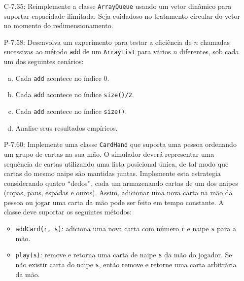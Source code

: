 \begin{enumerate}
\begin{itemize}
		\item[C-7.35:] Reimplemente a classe \texttt{ArrayQueue} usando um vetor dinâmico para suportar capacidade ilimitada. Seja cuidadoso no tratamento circular do vetor no momento do redimensionamento.
		
		\item[P-7.58:] Desenvolva um experimento para testar a eficiência de $n$ chamadas sucessivas ao método \texttt{add} de um \texttt{ArrayList} para vários $n$ diferentes, sob cada um dos seguintes cenários:
		\begin{enumerate}[a.]
			\item Cada \texttt{add} acontece no índice $0$.
			\item Cada \texttt{add} acontece no índice \texttt{size()/2}.
			\item Cada \texttt{add} acontece no índice \texttt{size()}.
			\item Analise seus resultados empíricos.
		\end{enumerate}
		
		\item[P-7.60:] Implemente uma classe \texttt{CardHand} que suporta uma pessoa ordenando um grupo de cartas na sua mão. O simulador deverá representar uma sequência de cartas utilizando uma lista posicional única, de tal modo que cartas do mesmo naipe são mantidas juntas. Implemente esta estrategia considerando quatro ``dedos'', cada um armazenando cartas de um dos naipes (copas, paus, espadas e ouros). Assim, adicionar uma nova carta na mão da pessoa ou jogar uma carta da mão pode ser feito em tempo constante. A classe deve suportar os seguintes métodos:
		\begin{itemize}
			\item \texttt{addCard(r,\,s)}: adiciona uma nova carta com número \texttt{r} e naipe \texttt{s} para a mão.
			\item \texttt{play(s)}: remove e retorna uma carta de naipe \texttt{s} da mão do jogador. Se não existir carta do naipe \texttt{s}, então remove e retorne uma carta arbitrária da mão.
		\end{itemize}
	\end{itemize}
\end{enumerate}

\medskip

\begingroup
	\footnotesize
	\renewcommand{\chapter}[2]{}%
	
	
\endgroup

